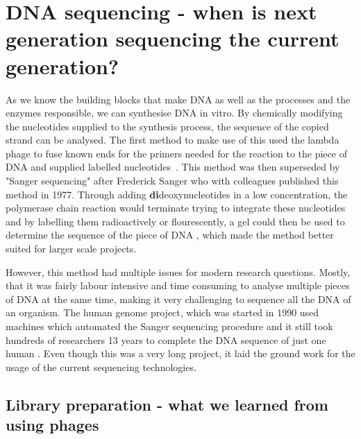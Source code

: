 \section[DNA sequencing]{DNA sequencing - when is next generation sequencing the current generation?}
\label{intro-sec:sequencing}

As we know the building blocks that make DNA as well as the processes and the enzymes responsible, we can synthesise DNA in vitro. By chemically modifying the nucleotides supplied to the synthesis process, the sequence of the copied strand can be analysed. The first method to make use of this used the lambda phage to fuse known ends for the primers needed for the reaction to the piece of DNA and supplied labelled nucleotides~\cite{Padmanabhan1974}. This method was then superseded by "Sanger sequencing" after Frederick Sanger who with colleagues published this method in 1977. Through adding \textbf{di}deoxynucleotides in a low concentration, the polymerase chain reaction would terminate trying to integrate these nucleotides and by labelling them radioactively or flourescently, a gel could then be used to determine the sequence of the piece of DNA \cite{Sanger1975,Sanger1977}, which made the method better suited for larger scale projects.

However, this method had multiple issues for modern research questions. Mostly, that it was fairly labour intensive and time consuming to analyse multiple pieces of DNA at the same time, making it very challenging to sequence all the DNA of an organism. The human genome project, which was started in 1990 used machines which automated the Sanger sequencing procedure and it still took hundreds of researchers 13 years to complete the DNA sequence of just one human \cite{Lander2001,Venter2001}. Even though this was a very long project, it laid the ground work for the usage of the current sequencing technologies.

\subsection[Library preparation]{Library preparation - what we learned from using phages}
\label{intro-sec:libraryprep}

